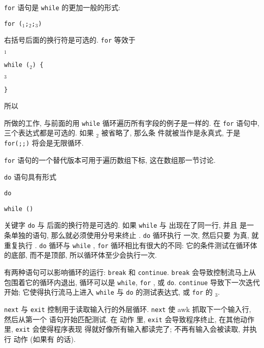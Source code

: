 \verb'for' 语句是 \verb'while' 的更加一般的形式:
\begin{pattern}
    \verb'for ('\expr$_1$\verb';'\expr$_2$\verb';'\expr$_3$\verb')' \par
    \indent\indent\stmt
\end{pattern}
右括号后面的换行符是可选的. \verb'for' 等效于
\begin{pattern}
    \expr$_1$ \par
    \verb'while ('\expr$_2$\verb') {' \par
        \indent\indent\stmt  \par
        \indent\indent\expr$_3$ \par
    \verb'}'
\end{pattern}
所以
所做的工作, 与前面的用 \verb'while' 循环遍历所有字段的例子是一样的. 在
\verb'for' 语句中, 三个表达式都是可选的. 如果 \expr$_2$ 被省略了, 那么条
件就被当作是永真式, 于是 \verb'for(;;)' 将会是无限循环.

\verb'for' 语句的一个替代版本可用于遍历数组下标, 这在数组那一节讨论.

\verb'do' 语句具有形式
\begin{pattern}
    \verb'do' \par
    \indent\indent\stmt\par
    \verb'while ('\expr\verb')'
\end{pattern}
关键字 \verb'do' 与 \stmt 后面的换行符是可选的. 如果 \verb'while' 与 \stmt
出现在了同一行, 并且 \stmt 是一条单独的语句, 那么就必须使用分号来终止
\stmt. \verb'do' 循环执行 \stmt 一次, 然后只要 \expr 为真, 就重复执行
\stmt. \verb'do' 循环与 \verb'while' , \verb'for' 循环相比有很大的不同:
它的条件测试在循环体的底部, 而不是顶部, 所以循环体至少会执行一次.

有两种语句可以影响循环的运行: \verb'break' 和 \verb'continue'. \verb'break'
会导致控制流马上从包围着它的循环内退出, 循环可以是 \verb'while', \verb'for'
, 或 \verb'do'. \verb'continue' 导致下一次迭代开始; 它使得执行流马上进入
\verb'while' 与 \verb'do' 的测试表达式, 或 \verb'for' 的 \expr$_3$.

\verb'next' 与 \verb'exit' 控制用于读取输入行的外层循环. \verb'next' 使
awk 抓取下一个输入行, 然后从第一个 \patact 语句开始匹配测试. 在 \END 动作
里, \verb'exit' 会导致程序终止, 在其他动作里, \verb'exit' 会使得程序表现
得就好像所有输入都读完了; 不再有输入会被读取, 并执行 \END 动作 (如果有 \END
的话).


